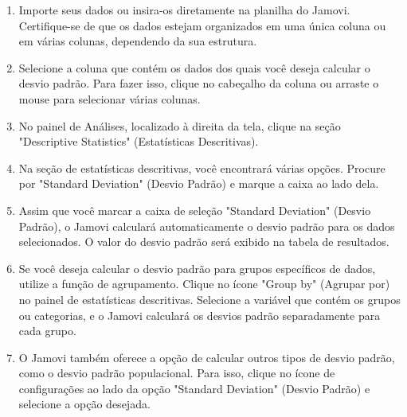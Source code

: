 \begin{enumerate}
    \item Importe seus dados ou insira-os diretamente na planilha do Jamovi. Certifique-se de que os dados estejam organizados em uma única coluna ou em várias colunas, dependendo da sua estrutura.
    \item Selecione a coluna que contém os dados dos quais você deseja calcular o desvio padrão. Para fazer isso, clique no cabeçalho da coluna ou arraste o mouse para selecionar várias colunas.
    \item No painel de Análises, localizado à direita da tela, clique na seção "Descriptive Statistics" (Estatísticas Descritivas).
    \item Na seção de estatísticas descritivas, você encontrará várias opções. Procure por "Standard Deviation" (Desvio Padrão) e marque a caixa ao lado dela.
    \item Assim que você marcar a caixa de seleção "Standard Deviation" (Desvio Padrão), o Jamovi calculará automaticamente o desvio padrão para os dados selecionados. O valor do desvio padrão será exibido na tabela de resultados.
    \item Se você deseja calcular o desvio padrão para grupos específicos de dados, utilize a função de agrupamento. Clique no ícone "Group by" (Agrupar por) no painel de estatísticas descritivas. Selecione a variável que contém os grupos ou categorias, e o Jamovi calculará os desvios padrão separadamente para cada grupo.
    \item O Jamovi também oferece a opção de calcular outros tipos de desvio padrão, como o desvio padrão populacional. Para isso, clique no ícone de configurações ao lado da opção "Standard Deviation" (Desvio Padrão) e selecione a opção desejada.
\end{enumerate}
